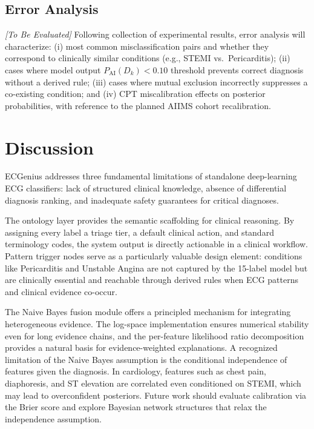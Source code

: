 \documentclass[journal]{IEEEtran}
\begin{document}
\subsection{Error Analysis}

\textit{[To Be Evaluated]}
Following collection of experimental results, error analysis will
characterize: (i) most common misclassification pairs and whether
they correspond to clinically similar conditions
(e.g., STEMI vs.\ Pericarditis); (ii) cases where model output
$P_{\text{AI}}(D_k) < 0.10$ threshold prevents correct diagnosis
without a derived rule; (iii) cases where mutual exclusion incorrectly
suppresses a co-existing condition; and (iv) CPT miscalibration
effects on posterior probabilities, with reference to the planned
AIIMS cohort recalibration.

\section{Discussion}
\label{sec:discussion}

ECGenius addresses three fundamental limitations of standalone
deep-learning ECG classifiers: lack of structured clinical knowledge,
absence of differential diagnosis ranking, and inadequate safety
guarantees for critical diagnoses.

The ontology layer provides the semantic scaffolding for clinical
reasoning.
By assigning every label a triage tier, a default clinical action,
and standard terminology codes, the system output is directly
actionable in a clinical workflow.
Pattern trigger nodes serve as a particularly valuable design
element: conditions like Pericarditis and Unstable Angina are not
captured by the 15-label model but are clinically essential and
reachable through derived rules when ECG patterns and clinical
evidence co-occur.

The Naive Bayes fusion module offers a principled mechanism for
integrating heterogeneous evidence.
The log-space implementation ensures numerical stability even for
long evidence chains, and the per-feature likelihood ratio
decomposition provides a natural basis for evidence-weighted
explanations.
A recognized limitation of the Naive Bayes assumption is the
conditional independence of features given the diagnosis.
In cardiology, features such as chest pain, diaphoresis, and
ST elevation are correlated even conditioned on STEMI, which may
lead to overconfident posteriors.
Future work should evaluate calibration via the Brier score and
explore Bayesian network structures that relax the independence
assumption.
\end{document}
